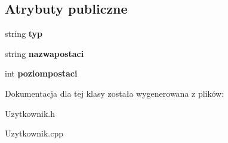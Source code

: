 \subsection*{Atrybuty publiczne}
\begin{DoxyCompactItemize}
\item 
string {\bfseries typ}\hypertarget{class_postac__uzytkownika_a118f68d33fa7221abacb941f792499d6}{}\label{class_postac__uzytkownika_a118f68d33fa7221abacb941f792499d6}

\item 
string {\bfseries nazwapostaci}\hypertarget{class_postac__uzytkownika_a6cec83d409d19037a6403b1244814987}{}\label{class_postac__uzytkownika_a6cec83d409d19037a6403b1244814987}

\item 
int {\bfseries poziompostaci}\hypertarget{class_postac__uzytkownika_a7da5fcde0c4d5509164edce424e00826}{}\label{class_postac__uzytkownika_a7da5fcde0c4d5509164edce424e00826}

\end{DoxyCompactItemize}


Dokumentacja dla tej klasy została wygenerowana z plików\+:\begin{DoxyCompactItemize}
\item 
Uzytkownik.\+h\item 
Uzytkownik.\+cpp\end{DoxyCompactItemize}
